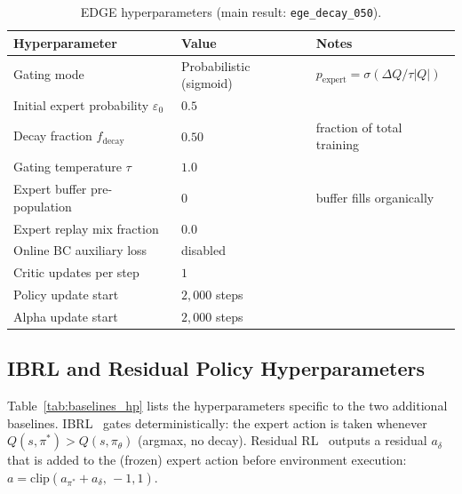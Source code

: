 \begin{table}[h]
\centering
\caption{EDGE hyperparameters (main result: \texttt{ege\_decay\_050}).}
\label{tab:ege_hp}
\begin{tabular}{lll}
\toprule
\textbf{Hyperparameter} & \textbf{Value} & \textbf{Notes} \\
\midrule
Gating mode               & Probabilistic (sigmoid) & $p_{\text{expert}} = \sigma(\Delta Q / \tau |Q|)$ \\
Initial expert probability $\varepsilon_0$ & $0.5$ & \\
Decay fraction $f_{\mathrm{decay}}$ & $0.50$ & fraction of total training \\
Gating temperature $\tau$ & $1.0$  & \\
Expert buffer pre-population & $0$  & buffer fills organically \\
Expert replay mix fraction & $0.0$ & \\
Online BC auxiliary loss  & disabled & \\
Critic updates per step   & $1$    & \\
Policy update start       & $2{,}000$ steps & \\
Alpha update start        & $2{,}000$ steps & \\
\bottomrule
\end{tabular}
\end{table}

\subsection*{IBRL and Residual Policy Hyperparameters}

Table~\ref{tab:baselines_hp} lists the hyperparameters specific to the two
additional baselines.
IBRL~\cite{hu2023ibrl} gates deterministically: the expert action is taken
whenever $Q(s, \pi^*) > Q(s, \pi_\theta)$ (argmax, no decay).
Residual RL~\cite{johannink2019residual} outputs a residual $a_\delta$ that is
added to the (frozen) expert action before environment execution:
$a = \mathrm{clip}(a_{\pi^*} + a_\delta,\, -1, 1)$.


